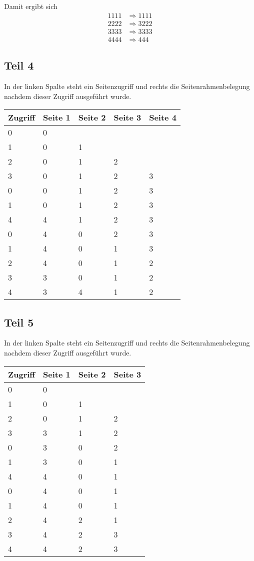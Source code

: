 \documentclass[10pt,a4paper]{article}
\begin{document}
Damit ergibt sich
\begin{align}
1111 & \Rightarrow 1111\\
2222 & \Rightarrow 3222\\
3333 & \Rightarrow 3333\\
4444 & \Rightarrow 444
\end{align}

\subsection*{Teil 4}

In der linken Spalte steht ein Seitenzugriff und rechts die Seitenrahmenbelegung nachdem dieser Zugriff ausgeführt wurde.

\begin{tabular}{|l|l|l|l|l|}
\hline
Zugriff & Seite 1 & Seite 2 & Seite 3 & Seite 4\\
\hline
0 & 0 &  &  & \\
1 & 0 & 1 &  & \\
2 & 0 & 1 & 2 & \\
3 & 0 & 1 & 2 & 3\\
0 & 0 & 1 & 2 & 3\\
1 & 0 & 1 & 2 & 3\\
4 & 4 & 1 & 2 & 3\\
0 & 4 & 0 & 2 & 3\\
1 & 4 & 0 & 1 & 3\\
2 & 4 & 0 & 1 & 2\\
3 & 3 & 0 & 1 & 2\\
4 & 3 & 4 & 1 & 2
\end{tabular}

\subsection*{Teil 5}

In der linken Spalte steht ein Seitenzugriff und rechts die Seitenrahmenbelegung nachdem dieser Zugriff ausgeführt wurde.

\begin{tabular}{|l|l|l|l|}
\hline
Zugriff & Seite 1 & Seite 2 & Seite 3\\
\hline
0 & 0 &  & \\
1 & 0 & 1 & \\
2 & 0 & 1 & 2\\
3 & 3 & 1 & 2\\
0 & 3 & 0 & 2\\
1 & 3 & 0 & 1\\
4 & 4 & 0 & 1\\
0 & 4 & 0 & 1\\
1 & 4 & 0 & 1\\
2 & 4 & 2 & 1\\
3 & 4 & 2 & 3\\
4 & 4 & 2 & 3
\end{tabular}
\end{document}
